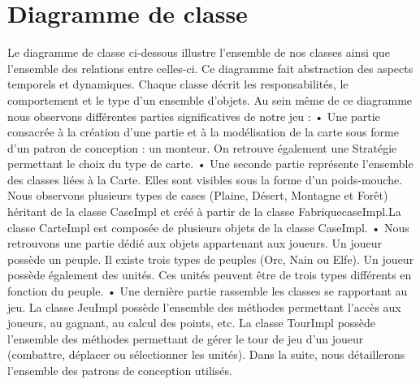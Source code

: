 \documentclass[a4paper,11pt]{article}
\begin{document}
\section{Diagramme de classe}
	\vspace*{0.5cm}
	Le diagramme de classe ci-dessous illustre l’ensemble de nos classes ainsi que l’ensemble des relations entre celles-ci. Ce diagramme fait abstraction des aspects temporels et dynamiques. Chaque classe décrit les responsabilités, le comportement et le type d’un ensemble d’objets. Au sein même de ce diagramme nous observons différentes parties significatives de notre jeu : 
•	Une partie consacrée à la création d’une partie et à la modélisation de la carte sous forme d’un patron de conception : un monteur. On retrouve également une Stratégie permettant le choix du type de carte.
•	Une seconde partie représente  l’ensemble des classes liées à la Carte. Elles sont visibles sous la forme d’un poids-mouche. Nous observons plusieurs types de cases (Plaine, Désert, Montagne et Forêt) héritant de la classe CaseImpl et créé à partir de la classe FabriquecaseImpl.La classe CarteImpl est composée de plusieurs objets de la classe CaseImpl.
•	Nous retrouvons une partie dédié aux objets appartenant aux joueurs. Un joueur possède un peuple. Il existe trois types de peuples (Orc, Nain ou Elfe). Un joueur possède également des unités. Ces unités peuvent être de trois types différents en fonction du peuple.
•	Une dernière partie rassemble les classes se rapportant au jeu. La classe JeuImpl  possède l’ensemble des méthodes permettant l’accès aux joueurs, au gagnant, au calcul des points, etc. La classe TourImpl possède l’ensemble des méthodes permettant de gérer le tour de jeu d’un joueur (combattre, déplacer ou sélectionner les unités).
Dans la suite, nous détaillerons l’ensemble des patrons de conception utilisés.
\end{document}
